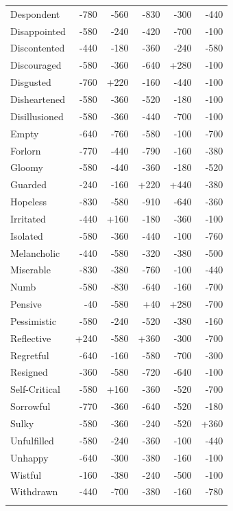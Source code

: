 \begin{longtable}{@{}p{}rrrrr}
Despondent & -780 & -560 & -830 & -300 & -440 \\
Disappointed & -580 & -240 & -420 & -700 & -100 \\
Discontented & -440 & -180 & -360 & -240 & -580 \\
Discouraged & -580 & -360 & -640 & +280 & -100 \\
Disgusted & -760 & +220 & -160 & -440 & -100 \\
Disheartened & -580 & -360 & -520 & -180 & -100 \\
Disillusioned & -580 & -360 & -440 & -700 & -100 \\
Empty & -640 & -760 & -580 & -100 & -700 \\
Forlorn & -770 & -440 & -790 & -160 & -380 \\
Gloomy & -580 & -440 & -360 & -180 & -520 \\
Guarded & -240 & -160 & +220 & +440 & -380 \\
Hopeless & -830 & -580 & -910 & -640 & -360 \\
Irritated & -440 & +160 & -180 & -360 & -100 \\
Isolated & -580 & -360 & -440 & -100 & -760 \\
Melancholic & -440 & -580 & -320 & -380 & -500 \\
Miserable & -830 & -380 & -760 & -100 & -440 \\
Numb & -580 & -830 & -640 & -160 & -700 \\
Pensive & -40 & -580 & +40 & +280 & -700 \\
Pessimistic & -580 & -240 & -520 & -380 & -160 \\
Reflective & +240 & -580 & +360 & -300 & -700 \\
Regretful & -640 & -160 & -580 & -700 & -300 \\
Resigned & -360 & -580 & -720 & -640 & -100 \\
Self-Critical & -580 & +160 & -360 & -520 & -700 \\
Sorrowful & -770 & -360 & -640 & -520 & -180 \\
Sulky & -580 & -360 & -240 & -520 & +360 \\
Unfulfilled & -580 & -240 & -360 & -100 & -440 \\
Unhappy & -640 & -300 & -380 & -160 & -100 \\
Wistful & -160 & -380 & -240 & -500 & -100 \\
Withdrawn & -440 & -700 & -380 & -160 & -780 \\
\addlinespace[2pt]\multicolumn{6}{@{}l}{\textbf{High-Arousal Positive} ($n=37$)} \\

\end{longtable}
